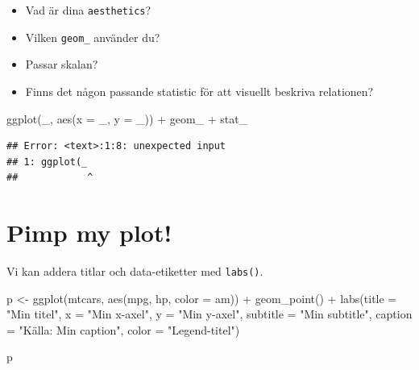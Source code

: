 \documentclass[
]{book}
\newenvironment{Shaded}{\begin{snugshade}}{\end{snugshade}}
\newcommand{\AttributeTok}[1]{\textcolor[rgb]{0.77,0.63,0.00}{#1}}
\newcommand{\FunctionTok}[1]{\textcolor[rgb]{0.00,0.00,0.00}{#1}}
\newcommand{\NormalTok}[1]{#1}
\newcommand{\OtherTok}[1]{\textcolor[rgb]{0.56,0.35,0.01}{#1}}
\newcommand{\SpecialCharTok}[1]{\textcolor[rgb]{0.00,0.00,0.00}{#1}}
\newcommand{\StringTok}[1]{\textcolor[rgb]{0.31,0.60,0.02}{#1}}
\providecommand{\tightlist}{%
  \setlength{\itemsep}{0pt}\setlength{\parskip}{0pt}}
\begin{document}
\begin{itemize}
\tightlist
\item
  Vad är dina \texttt{aesthetics}?
\item
  Vilken \texttt{geom\_} använder du?
\item
  Passar skalan?
\item
  Finns det någon passande statistic för att visuellt beskriva relationen?
\end{itemize}

\begin{Shaded}
\begin{Highlighting}[]
\FunctionTok{ggplot}\NormalTok{(\_, }\FunctionTok{aes}\NormalTok{(}\AttributeTok{x =}\NormalTok{ \_, }\AttributeTok{y =}\NormalTok{ \_)) }\SpecialCharTok{+}
\NormalTok{  geom\_ }\SpecialCharTok{+}
\NormalTok{  stat\_}
\end{Highlighting}
\end{Shaded}

\begin{verbatim}
## Error: <text>:1:8: unexpected input
## 1: ggplot(_
##            ^
\end{verbatim}

\hypertarget{pimp-my-plot}{%
\section{Pimp my plot!}\label{pimp-my-plot}}

Vi kan addera titlar och data-etiketter med \texttt{labs()}.

\begin{Shaded}
\begin{Highlighting}[]
\NormalTok{p }\OtherTok{\textless{}{-}} \FunctionTok{ggplot}\NormalTok{(mtcars, }\FunctionTok{aes}\NormalTok{(mpg, hp, }\AttributeTok{color =}\NormalTok{ am)) }\SpecialCharTok{+}
  \FunctionTok{geom\_point}\NormalTok{() }\SpecialCharTok{+}
  \FunctionTok{labs}\NormalTok{(}\AttributeTok{title =} \StringTok{"Min titel"}\NormalTok{,}
       \AttributeTok{x =} \StringTok{"Min x{-}axel"}\NormalTok{,}
       \AttributeTok{y =} \StringTok{"Min y{-}axel"}\NormalTok{, }
       \AttributeTok{subtitle =} \StringTok{"Min subtitle"}\NormalTok{,}
       \AttributeTok{caption =} \StringTok{"Källa: Min caption"}\NormalTok{,}
       \AttributeTok{color =} \StringTok{"Legend{-}titel"}\NormalTok{)}

\NormalTok{p}
\end{Highlighting}
\end{Shaded}
\end{document}
